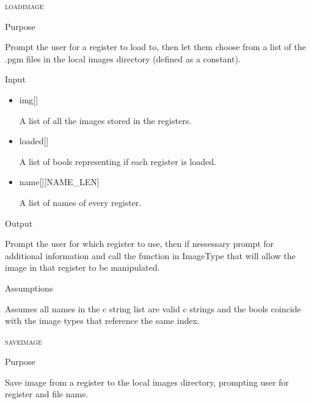 \documentclass[pdftex, 11pt]{article}
\begin{document}
\begin{description}
\begin{description}
		\end{description}



	\item{\textsc{loadimage}}
		\begin{description}
			\item{Purpose}

				Prompt the user for a register to load to, then let them choose from a list
				of the .pgm files in the local images directory (defined as a constant).

			\item{Input}

				\begin{itemize}

					\item{img[]}

						A list of all the images stored in the registers.

					\item{loaded[]}

						A list of bools representing if each register is loaded.

					\item{name[][NAME\_LEN]}

						A list of names of every register.

				\end{itemize}

			\item{Output}

				Prompt the user for which register to use, then if nessessary
				prompt for additional information and call the function
				in ImageType that will allow the image in that register to
				be manipulated.

			\item{Assumptions}

				Assumes all names in the c string list are valid c
				strings and the bools coincide with the image types that
				reference the same index.

		\end{description}



	\item{\textsc{saveimage}}
		\begin{description}
			\item{Purpose}

				Save image from a register to the local images directory, prompting user for
				register and file name.


\end{description}
\end{description}
\end{document}
